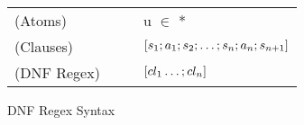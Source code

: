 \begin{figure}
\begin{tabular}{l@{\ }l@{\ }c@{\ }l}

(Atoms)& \Atom{} & \GEq{} & u $\in$ \TypeContext{} \GBar{} \DNFRegex{}* \\
(Clauses)& \Clause{} & \GEq{} &
$[s_1; a_1 ; s_2 ; \ldots ; s_n ; a_n ; s_{n+1}]$ \\
(DNF Regex)& \DNFRegex{} & \GEq{} & $[cl_1 \ldots ; cl_n]$ \\
\end{tabular}
\caption{DNF Regex Syntax}
\label{fig:dnf-regex-definition}
\end{figure}
